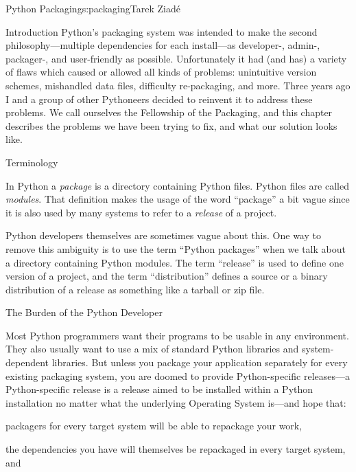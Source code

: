 \begin{aosachapter}{Python Packaging}{s:packaging}{Tarek Ziad\'{e}}
\begin{aosasect1}{Introduction}
Python's packaging system was intended to make the second
philosophy---multiple dependencies for each install---as developer-,
admin-, packager-, and user-friendly as possible. Unfortunately it had
(and has) a variety of flaws which caused or allowed all kinds of
problems: unintuitive version schemes, mishandled data files,
difficulty re-packaging, and more.  Three years ago I and a group of
other Pythoneers decided to reinvent it to address these problems.  We
call ourselves the Fellowship of the Packaging, and this chapter
describes the problems we have been trying to fix, and what our
solution looks like.

\begin{aosabox}{Terminology}

In Python a \emph{package} is a directory containing Python
files. Python files are called \emph{modules}.  That definition makes
the usage of the word ``package'' a bit vague since it is also used by
many systems to refer to a \emph{release} of a project.

Python developers themselves are sometimes vague about this.  One way
to remove this ambiguity is to use the term ``Python packages'' when
we talk about a directory containing Python modules.  The term
``release'' is used to define one version of a project, and the term
``distribution'' defines a source or a binary distribution of a
release as something like a tarball or zip file.

\end{aosabox}

\end{aosasect1}

\begin{aosasect1}{The Burden of the Python Developer}

Most Python programmers want their programs to be usable in any
environment.  They also usually want to use a mix of standard Python
libraries and system-dependent libraries.  But unless you package your
application separately for every existing packaging system, you are
doomed to provide Python-specific releases---a Python-specific release
is a release aimed to be installed within a Python installation no
matter what the underlying Operating System is---and hope that:

\begin{aosaitemize}

  \item packagers for every target system will be able to repackage
  your work,

  \item the dependencies you have will themselves be repackaged in
  every target system, and


\end{aosaitemize}
\end{aosasect1}
\end{aosachapter}
